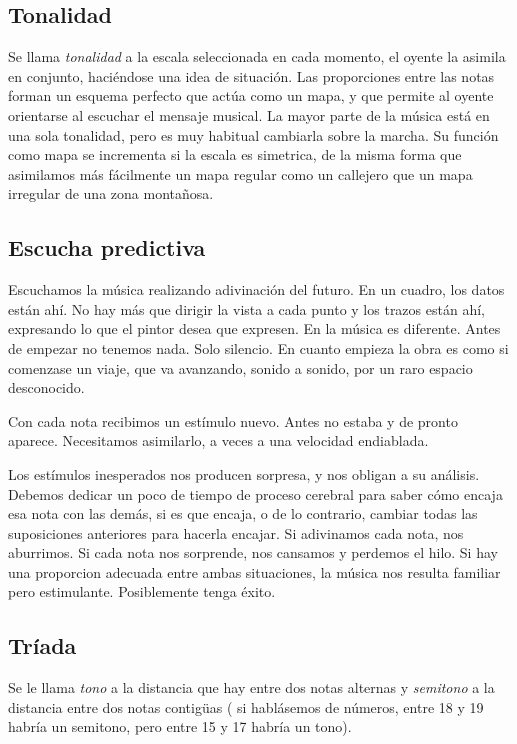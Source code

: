 \documentclass[]{article}
\begin{document}
\subsection{Tonalidad}

Se llama \emph{tonalidad} a la escala seleccionada en cada momento, el oyente la asimila en conjunto, haciéndose una idea de situación. Las proporciones entre las notas forman un esquema perfecto que actúa como un mapa, y que permite al oyente orientarse al escuchar el mensaje musical. La mayor parte de la música está en una sola tonalidad, pero es muy habitual cambiarla sobre la marcha. Su función como mapa se incrementa si la escala es simetrica, de la misma forma que asimilamos más fácilmente un mapa regular como un callejero que un mapa irregular de una zona montañosa.

\subsection{Escucha predictiva}

Escuchamos la música realizando adivinación del futuro. En un cuadro, los datos están ahí. No hay más que dirigir la vista a cada punto y los trazos están ahí, expresando lo que el pintor desea que expresen. En la música es diferente. Antes de empezar no tenemos nada. Solo silencio. En cuanto empieza la obra es como si comenzase un viaje, que va avanzando, sonido a sonido, por un raro espacio desconocido.

Con cada nota recibimos un estímulo nuevo. Antes no estaba y de pronto aparece. Necesitamos asimilarlo, a veces a una velocidad endiablada.

Los estímulos inesperados nos producen sorpresa, y nos obligan a su análisis. Debemos dedicar un poco de tiempo de proceso cerebral para saber cómo encaja esa nota con las demás, si es que encaja, o de lo contrario, cambiar todas las suposiciones anteriores para hacerla encajar. Si adivinamos cada nota, nos aburrimos. Si cada nota nos sorprende, nos cansamos y perdemos el hilo. Si hay una proporcion adecuada entre ambas situaciones, la música nos resulta familiar pero estimulante. Posiblemente tenga éxito.

\subsection{Tríada}

Se le llama \emph{tono} a la distancia que hay entre dos notas alternas y \emph{semitono} a la distancia entre dos notas contigüas ( si hablásemos de números, entre 18 y 19 habría un semitono, pero entre 15 y 17 habría un tono).
\end{document}
